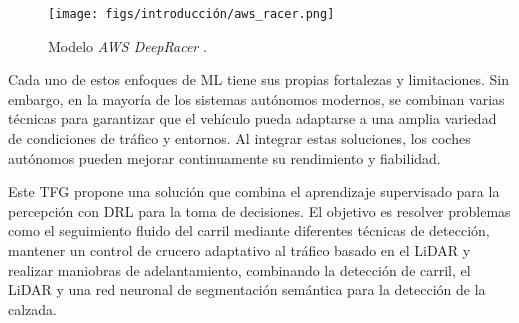 \begin{figure}[ht]
\begin{center}
\texttt{[image: figs/introducción/aws\_racer.png]}
\end{center}
\caption{Modelo \textit{AWS DeepRacer} \cite{aws-deepracer}.}
\label{aws}
\end{figure}

Cada uno de estos enfoques de \ac{ML} tiene sus propias fortalezas y limitaciones. Sin embargo, en la mayoría de los sistemas autónomos modernos, se combinan varias técnicas para garantizar que el vehículo pueda adaptarse a una amplia variedad de condiciones de tráfico y entornos. Al integrar estas soluciones, los coches autónomos pueden mejorar continuamente su rendimiento y fiabilidad.

Este \ac{TFG} propone una solución que combina el aprendizaje supervisado para la percepción con \ac{DRL} para la toma de decisiones. El objetivo es resolver problemas como el seguimiento fluido del carril mediante diferentes técnicas de detección, mantener un control de crucero adaptativo al tráfico basado en el \ac{LiDAR} y realizar maniobras de adelantamiento, combinando la detección de carril, el \ac{LiDAR} y una red neuronal de segmentación semántica para la detección de la calzada. 



